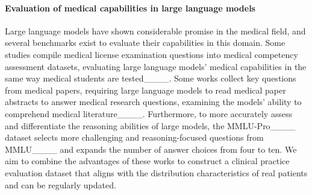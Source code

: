\paragraph{Evaluation of medical capabilities in large language models} Large language models have shown considerable promise in the medical field, and several benchmarks exist to evaluate their capabilities in this domain. Some studies compile medical license examination questions into medical competency assessment datasets, evaluating large language models’ medical capabilities in the same way medical students are tested____. Some works collect key questions from medical papers, requiring large language models to read medical paper abstracts to answer medical research questions, examining the models’ ability to comprehend medical literature____. Furthermore, to more accurately assess and differentiate the reasoning abilities of large models, the MMLU-Pro____ dataset selects more challenging and reasoning-focused questions from MMLU____ and expands the number of answer choices from four to ten. We aim to combine the advantages of these works to construct a clinical practice evaluation dataset that aligns with the distribution characteristics of real patients and can be regularly updated.